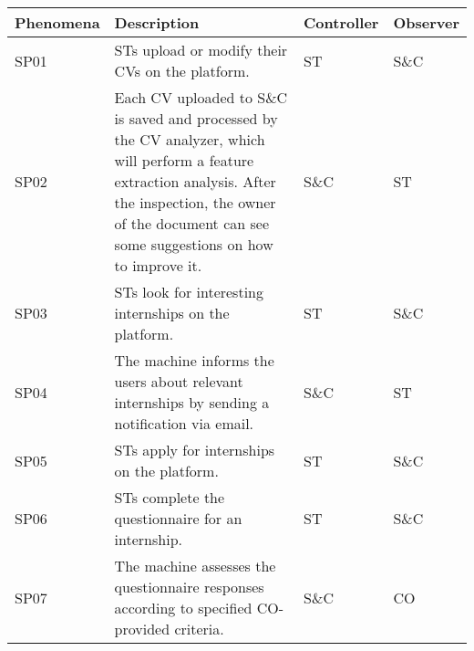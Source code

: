 \begin{longtable}{|l|p{}|l|l|}
    \hline
    \textbf{Phenomena} & \textbf{Description}                                                                                                                                                                                                                                  & Controller & Observer \\
    \hline \hline
    SP01               & STs upload or modify their CVs on the platform.                                                                                                                                                                                                       & ST         & S\&C     \\
    \hline
    SP02               & Each CV uploaded to S\&C is saved and processed by the CV analyzer, which will perform a feature extraction analysis. After the inspection, the owner of the document can see some suggestions on how to improve it.                                  & S\&C       & ST       \\
    \hline
    SP03               & STs look for interesting internships on the platform.                                                                                                                                                                                                 & ST         & S\&C     \\
    \hline
    SP04               & The machine informs the users about relevant internships by sending a notification via email.                                                                                                                                                         & S\&C       & ST       \\
    \hline
    SP05               & STs apply for internships on the platform.                                                                                                                                                                                                            & ST         & S\&C     \\
    \hline
    SP06               & STs complete the questionnaire for an internship.                                                                                                                                                                                                     & ST         & S\&C     \\
    \hline
    SP07               & The machine assesses the questionnaire responses according to specified CO-provided criteria.                                                                                                                                                         & S\&C       & CO       \\

\end{longtable}
